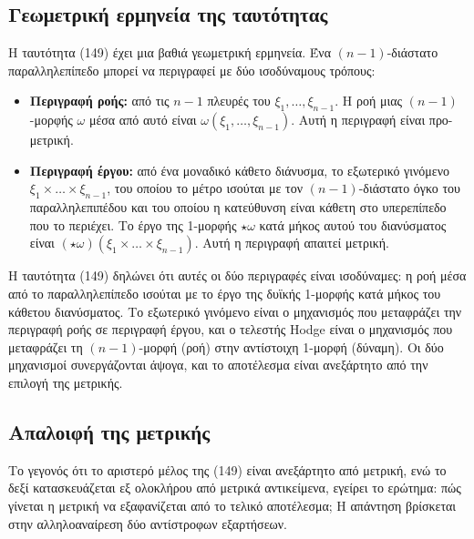 \documentclass[12pt]{article}
\begin{document}
\subsection{Γεωμετρική ερμηνεία της ταυτότητας}

Η ταυτότητα (149) έχει μια βαθιά γεωμετρική ερμηνεία. Ένα $(n-1)$-διάστατο παραλληλεπίπεδο μπορεί να περιγραφεί με δύο ισοδύναμους τρόπους:

\begin{itemize}
\item \textbf{Περιγραφή ροής:} από τις $n-1$ πλευρές του $\xi_1, \dots, \xi_{n-1}$. Η ροή μιας $(n-1)$-μορφής $\omega$ μέσα από αυτό είναι $\omega(\xi_1, \dots, \xi_{n-1})$. Αυτή η περιγραφή είναι προ-μετρική.
\item \textbf{Περιγραφή έργου:} από ένα μοναδικό κάθετο διάνυσμα, το εξωτερικό γινόμενο $\xi_1 \times \dots \times \xi_{n-1}$, του οποίου το μέτρο ισούται με τον $(n-1)$-διάστατο όγκο του παραλληλεπιπέδου και του οποίου η κατεύθυνση είναι κάθετη στο υπερεπίπεδο που το περιέχει. Το έργο της 1-μορφής $\star \omega$ κατά μήκος αυτού του διανύσματος είναι $(\star \omega)(\xi_1 \times \dots \times \xi_{n-1})$. Αυτή η περιγραφή απαιτεί μετρική.
\end{itemize}

Η ταυτότητα (149) δηλώνει ότι αυτές οι δύο περιγραφές είναι ισοδύναμες: η ροή μέσα από το παραλληλεπίπεδο ισούται με το έργο της δυϊκής 1-μορφής κατά μήκος του κάθετου διανύσματος. Το εξωτερικό γινόμενο είναι ο μηχανισμός που μεταφράζει την περιγραφή ροής σε περιγραφή έργου, και ο τελεστής Hodge είναι ο μηχανισμός που μεταφράζει τη $(n-1)$-μορφή (ροή) στην αντίστοιχη 1-μορφή (δύναμη). Οι δύο μηχανισμοί συνεργάζονται άψογα, και το αποτέλεσμα είναι ανεξάρτητο από την επιλογή της μετρικής.

\subsection{Απαλοιφή της μετρικής}

Το γεγονός ότι το αριστερό μέλος της (149) είναι ανεξάρτητο από μετρική, ενώ το δεξί κατασκευάζεται εξ ολοκλήρου από μετρικά αντικείμενα, εγείρει το ερώτημα: πώς γίνεται η μετρική να εξαφανίζεται από το τελικό αποτέλεσμα; Η απάντηση βρίσκεται στην αλληλοαναίρεση δύο αντίστροφων εξαρτήσεων.
\end{document}
